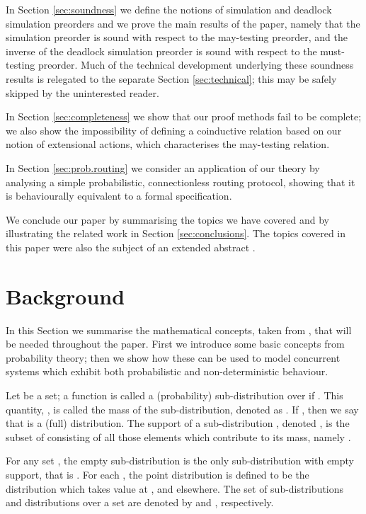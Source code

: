 \documentclass{LMCS}
\begin{document}
In Section \ref{sec:soundness} we define the notions of simulation and 
deadlock simulation preorders and we prove the main results of the paper, 
namely that the simulation preorder is sound with respect to the may-testing 
preorder, and the inverse of the deadlock simulation preorder is sound 
with respect to the must-testing preorder. Much of the technical 
development underlying these soundness results is relegated to the separate 
Section \ref{sec:technical}; this may be safely skipped by the uninterested reader.

In Section \ref{sec:completeness} we show that our proof methods fail to be 
complete; we also show the impossibility of defining 
a coinductive relation based on our notion of extensional actions, which characterises 
the may-testing relation. 

In Section \ref{sec:prob.routing} we consider an application of our theory 
by analysing a simple probabilistic, connectionless routing protocol, 
showing that it is behaviourally equivalent to a formal specification. 

We conclude our paper by summarising the topics we have covered and by illustrating 
the related work in Section \ref{sec:conclusions}. The topics 
covered in this paper were also the subject of an extended abstract 
\cite{extabs}.

\section{Background}
\label{sec:background}

In this Section we summarise the mathematical concepts, taken
from \cite{DGHM09full}, that will be needed throughout the paper.
First we introduce some basic concepts from  probability theory;
then we show how these can be used to model concurrent systems
which  exhibit  both probabilistic and non-deterministic
behaviour. 

Let  be a set; a function  is called a
(probability) sub-distribution over  if .  This quantity, , is called the mass of the
sub-distribution, denoted as . If ,
then we say that  is a (full) distribution. The support of a
sub-distribution , denoted , is the subset of
 consisting of all those elements which contribute to its mass,
namely . 

For any set , the empty sub-distribution  is the only sub-distribution with empty support, 
that is .
For each
, the point distribution  is defined to be the
distribution which takes value  at , and  elsewhere.  The set
of sub-distributions and distributions over a set  are denoted by
 and , respectively.
\end{document}
